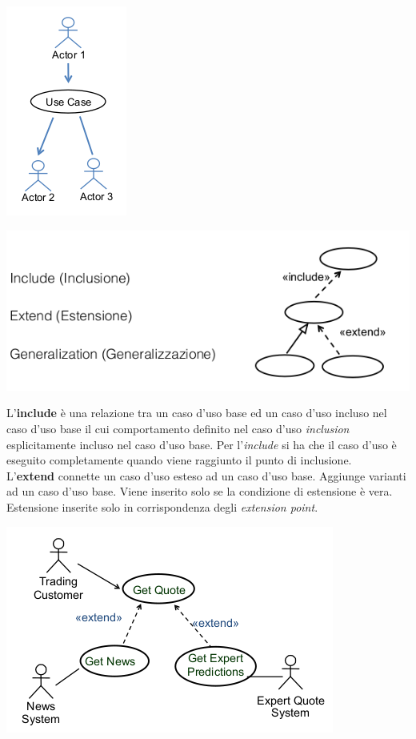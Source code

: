 \documentclass[a4paper,12pt, oneside]{book}
\begin{document}
\begin{center}
\includegraphics[scale=0.7]{img/ass.png}
\end{center}
\begin{center}
\includegraphics[scale=0.7]{img/ass3.png}
\end{center}
L'\textbf{include} è una relazione tra un caso d'uso base ed un caso d'uso incluso nel caso d'uso base il cui comportamento definito nel caso d'uso
\textit{inclusion} esplicitamente incluso nel caso
d'uso base. Per l'\textit{include} si ha che il caso d'uso è eseguito completamente quando viene
raggiunto il punto di inclusione.\\
L'\textbf{extend} connette un caso d'uso esteso ad un
caso d'uso base. Aggiunge varianti ad un caso d'uso
base. Viene inserito solo se la condizione di
estensione è vera. Estensione inserite solo in
corrispondenza degli \textit{extension point}.
\begin{center}
\includegraphics[scale=0.7]{img/ex.png}
\end{center}
\end{document}
